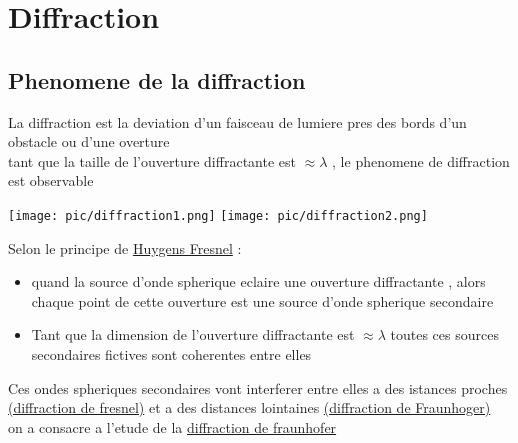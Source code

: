 \documentclass[12pt]{book}
\begin{document}
    \chapter{Diffraction}
        \section{Phenomene de la diffraction}
            La diffraction est la deviation d'un faisceau de lumiere pres des bords d'un obstacle ou d'une overture \\
            tant que la taille de l'ouverture diffractante est $\approx \lambda$ , le phenomene de diffraction est observable 
            \begin{center}
                \texttt{[image: pic/diffraction1.png]}
                \texttt{[image: pic/diffraction2.png]}
            \end{center}
            Selon le principe de \underline{Huygens Fresnel} :
                \begin{itemize}
                    \item quand la source d'onde spherique eclaire une ouverture diffractante , alors chaque point de cette ouverture  est une source d'onde spherique secondaire 
                    \item Tant que la dimension de l'ouverture diffractante est $\approx \lambda $ toutes ces sources secondaires fictives sont coherentes entre elles  
                \end{itemize}
            Ces ondes spheriques secondaires vont interferer entre elles a des istances proches \underline{(diffraction de fresnel)} et a des  distances lointaines \underline{ (diffraction de Fraunhoger)} \\
            on a consacre a l'etude de la \underline{diffraction de fraunhofer}
\end{document}

